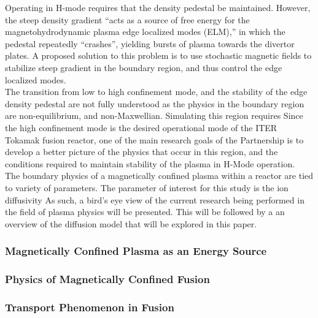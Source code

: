 \documentclass{article}
\begin{document}
Operating in H-mode requires that the density pedestal be maintained. However, the steep density gradient “acts as a source of free energy for the magnetohydrodynamic plasma edge localized modes (ELM),” in which the pedestal repeatedly “crashes”, yielding bursts of plasma towards the divertor plates. A proposed solution to this problem is to use stochastic magnetic fields to stabilize steep gradient in the boundary region, and thus control the edge localized modes.\\

The transition from low to high confinement mode, and the stability of the edge density pedestal are not fully understood as the physics in the boundary region are non-equilibrium, and non-Maxwellian. Simulating this region requires
Since the high confinement mode is the desired operational mode of the ITER Tokamak fusion reactor, one of the main research goals of the Partnership is to develop a better picture of the physics that occur in this region, and the conditions required to maintain stability of the plasma in H-Mode operation.\\

 \cite{PPPL_P:2}
The boundary physics of a magnetically confined plasma within a reactor are tied to variety of parameters. The parameter of interest for this study is the ion diffusivity 
As such, a bird's eye view of the current research being performed in the field of plasma physics will be presented. \cite{J_Friedberg:1}
This will be followed by a an overview of the diffusion model that will be explored in this paper.\\
\subsubsection{Magnetically Confined Plasma as an Energy Source}
\subsubsection{Physics of Magnetically Confined Fusion}
\subsubsection{Transport Phenomenon in Fusion}
\newpage


\end{document}
